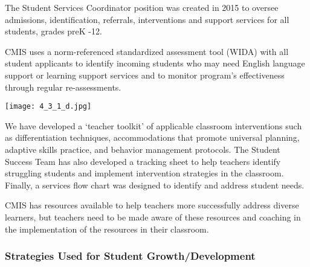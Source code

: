 \begin{findings}
The Student Services Coordinator position was created in 2015 to oversee admissions, identification, referrals, interventions and support services for all students, grades preK -12.

CMIS uses a norm-referenced standardized assessment tool (WIDA) with all student applicants to identify incoming students who may need English language support or learning support services and to monitor program’s effectiveness through regular re-assessments.
 
{\centering\texttt{[image: 4\_3\_1\_d.jpg]}}

We have developed a ‘teacher toolkit’ of applicable classroom interventions such as differentiation techniques, accommodations that promote universal planning, adaptive skills practice, and behavior management protocols. The Student Success Team has also developed a tracking sheet to help teachers identify struggling students and implement intervention strategies in the classroom. Finally, a services flow chart was designed to identify and address student needs.


CMIS has resources available to help teachers more successfully address diverse learners, but teachers need to be made aware of these resources and coaching in the implementation of the resources in their classroom.
\end{findings}

\subsubsection{Strategies Used for Student Growth/Development}



